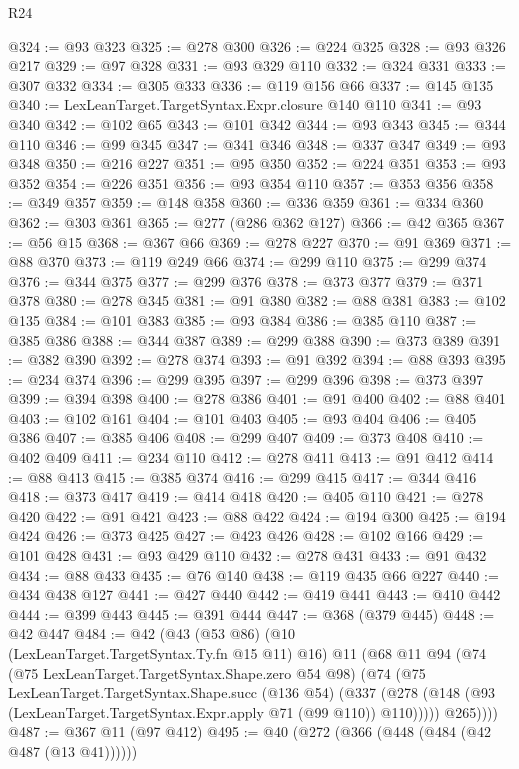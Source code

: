 \begin{lexlean}{R24}
\begin{coremodule}
@324 := @93 @323
@325 := @278 @300
@326 := @224 @325
@328 := @93 @326 @217
@329 := @97 @328
@331 := @93 @329 @110
@332 := @324 @331
@333 := @307 @332
@334 := @305 @333
@336 := @119 @156 @66
@337 := @145 @135
@340 := LexLeanTarget.TargetSyntax.Expr.closure @140 @110
@341 := @93 @340
@342 := @102 @65
@343 := @101 @342
@344 := @93 @343
@345 := @344 @110
@346 := @99 @345
@347 := @341 @346
@348 := @337 @347
@349 := @93 @348
@350 := @216 @227
@351 := @95 @350
@352 := @224 @351
@353 := @93 @352
@354 := @226 @351
@356 := @93 @354 @110
@357 := @353 @356
@358 := @349 @357
@359 := @148 @358
@360 := @336 @359
@361 := @334 @360
@362 := @303 @361
@365 := @277 (@286 @362 @127)
@366 := @42 @365
@367 := @56 @15
@368 := @367 @66
@369 := @278 @227
@370 := @91 @369
@371 := @88 @370
@373 := @119 @249 @66
@374 := @299 @110
@375 := @299 @374
@376 := @344 @375
@377 := @299 @376
@378 := @373 @377
@379 := @371 @378
@380 := @278 @345
@381 := @91 @380
@382 := @88 @381
@383 := @102 @135
@384 := @101 @383
@385 := @93 @384
@386 := @385 @110
@387 := @385 @386
@388 := @344 @387
@389 := @299 @388
@390 := @373 @389
@391 := @382 @390
@392 := @278 @374
@393 := @91 @392
@394 := @88 @393
@395 := @234 @374
@396 := @299 @395
@397 := @299 @396
@398 := @373 @397
@399 := @394 @398
@400 := @278 @386
@401 := @91 @400
@402 := @88 @401
@403 := @102 @161
@404 := @101 @403
@405 := @93 @404
@406 := @405 @386
@407 := @385 @406
@408 := @299 @407
@409 := @373 @408
@410 := @402 @409
@411 := @234 @110
@412 := @278 @411
@413 := @91 @412
@414 := @88 @413
@415 := @385 @374
@416 := @299 @415
@417 := @344 @416
@418 := @373 @417
@419 := @414 @418
@420 := @405 @110
@421 := @278 @420
@422 := @91 @421
@423 := @88 @422
@424 := @194 @300
@425 := @194 @424
@426 := @373 @425
@427 := @423 @426
@428 := @102 @166
@429 := @101 @428
@431 := @93 @429 @110
@432 := @278 @431
@433 := @91 @432
@434 := @88 @433
@435 := @76 @140
@438 := @119 @435 @66 @227
@440 := @434 @438 @127
@441 := @427 @440
@442 := @419 @441
@443 := @410 @442
@444 := @399 @443
@445 := @391 @444
@447 := @368 (@379 @445)
@448 := @42 @447
@484 := @42
    (@43
      (@53 @86)
      (@10 (LexLeanTarget.TargetSyntax.Ty.fn @15 @11) @16)
      @11
      (@68
        @11
        @94
        (@74
          (@75 LexLeanTarget.TargetSyntax.Shape.zero @54 @98)
          (@74
            (@75
              LexLeanTarget.TargetSyntax.Shape.succ
              (@136 @54)
              (@337
                (@278 (@148 (@93 (LexLeanTarget.TargetSyntax.Expr.apply @71 (@99 @110)) @110)))))
            @265))))
@487 := @367 @11 (@97 @412)
@495 := @40 (@272 (@366 (@448 (@484 (@42 @487 (@13 @41))))))

\end{coremodule}
\end{lexlean}
